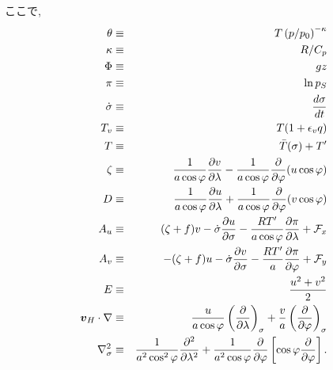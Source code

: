 ここで,
%
\begin{eqnarray}
\theta & \equiv & T \left( p/p_{0} \right)^{-\kappa} \\
\kappa & \equiv & R/C_{p} \\
  \Phi & \equiv & gz \\
   \pi & \equiv & \ln p_{S} \\
%
 \dot{\sigma} & \equiv &  \frac{d \sigma}{d t} \\
%
     T_v & \equiv & T ( 1+\epsilon_v q ) \\
     T & \equiv &  \bar{T}(\sigma) + T^{\prime} \\
%
\label{渦度定義}
 \zeta & \equiv & \frac{1}{a \cos\varphi }
                    \frac{\partial v}{\partial \lambda} 
             -    \frac{1}{a \cos\varphi }
                    \frac{\partial }{\partial \varphi}
                    ( u \cos\varphi ) \\
%
\label{発散定義}
     D & \equiv & \frac{1}{a \cos\varphi }
                    \frac{\partial u}{\partial \lambda} 
             +    \frac{1}{a \cos\varphi }
                    \frac{\partial }{\partial \varphi}
                    ( v \cos\varphi ) \\
%
\label{B項}
    A_u & \equiv &  ( \zeta + f ) v
             - \dot{\sigma} \frac{\partial u}{\partial \sigma} 
             - \frac{RT^{\prime}}{a\cos\varphi} 
                  \frac{\partial \pi}{\partial \lambda} 
             + {\cal F}_x \\
%
\label{A項}
    A_v & \equiv & - ( \zeta + f ) u
             - \dot{\sigma} \frac{\partial v}{\partial \sigma} 
             - \frac{RT^{\prime}}{a}
                  \frac{\partial \pi}{\partial \varphi} 
             + {\cal F}_y \\
%
\label{E項}
     E & \equiv &  \frac{u^{2}+v^{2}}{2} \\
%
 \Dvect{v}_{H} \cdot \nabla
       & \equiv & \frac{u}{a \cos \varphi} 
         \left( \frac{\partial }{\partial \lambda} \right)_{\sigma}
     + \frac{v}{a}
         \left( \frac{\partial }{\partial \varphi} \right)_{\sigma} 
           \nonumber \\
  \nabla^{2}_{\sigma}  
       & \equiv & 
               \frac{1}{a^{2}\cos^2\varphi} 
                 \frac{\partial^{2} }{\partial \lambda^{2}} 
             + \frac{1}{a^{2}\cos\varphi} 
                 \frac{\partial }{\partial \varphi}
                 \left[ \cos\varphi
                       \frac{\partial }{\partial \varphi} \right]  .
\end{eqnarray}

